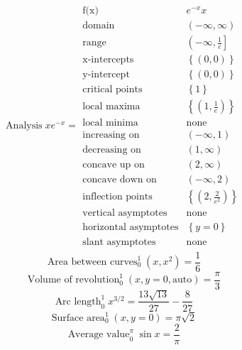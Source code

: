 \documentclass[11pt,a4paper]{article}
\theoremstyle{plain}
\theoremstyle{definition}
\theoremstyle{remark}
\begin{document}
\begin{align*}
  \operatorname{Analysis} {x e^{-x}} = \begin{array}{ll} \text{f(x)} & e^{-x} x \\ \text{domain} & \left(-\infty, \infty\right) \\ \text{range} & \left(-\infty, \frac{1}{e}\right] \\ \text{x-intercepts} & \left\{\left(0, 0\right)\right\} \\ \text{y-intercept} & \left\{\left(0, 0\right)\right\} \\ \text{critical points} & \left\{1\right\} \\ \text{local maxima} & \left\{\left(1, \frac{1}{e}\right)\right\} \\ \text{local minima} & \text{none} \\ \text{increasing on} & \left(-\infty, 1\right) \\ \text{decreasing on} & \left(1, \infty\right) \\ \text{concave up on} & \left(2, \infty\right) \\ \text{concave down on} & \left(-\infty, 2\right) \\ \text{inflection points} & \left\{\left(2, \frac{2}{e^{2}}\right)\right\} \\ \text{vertical asymptotes} & \text{none} \\ \text{horizontal asymptotes} & \left\{y = 0\right\} \\ \text{slant asymptotes} & \text{none} \end{array}
\end{align*}
\begin{equation*}
  \operatorname{Area\ between\ curves}_{{0}}^{{1}} \left( {x}, {x^2} \right) = \frac{1}{6}
\end{equation*}
\begin{equation*}
  \operatorname{Volume\ of\ revolution}_{{0}}^{{1}} \left( {x}, {y = 0}, {\text{auto}} \right) = \frac{\pi}{3}
\end{equation*}
\begin{equation*}
  \operatorname{Arc\ length}_{{0}}^{{1}} {x^{3/2}} = \frac{13 \sqrt{13}}{27} - \frac{8}{27}
\end{equation*}
\begin{equation*}
  \operatorname{Surface\ area}_{{0}}^{{1}} \left( {x}, {y = 0} \right) = \pi \sqrt{2}
\end{equation*}
\begin{equation*}
  \operatorname{Average\ value}_{{0}}^{{\pi}} {\sin x} = \frac{2}{\pi}
\end{equation*}
\end{document}
